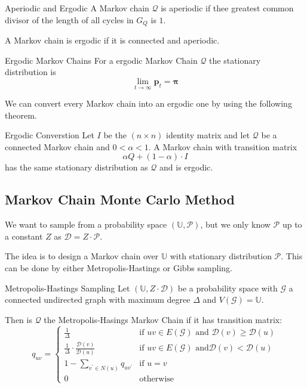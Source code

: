 \documentclass[english]{panikzettel}
\begin{document}

\begin{defi}{Aperiodic and Ergodic}
A Markov chain $\mathcal{Q}$ is aperiodic if thee greatest common divisor of the length of all cycles in $G_Q$ is $1$.

A Markov chain is ergodic if it is connected and aperiodic.
\end{defi}

\begin{theo}{Ergodic Markov Chains}
For a ergodic Markov Chain $\mathcal{Q}$ the stationary distribution is
$$
\lim_{t \rightarrow \infty} \textbf{p}_t = \boldsymbol{\pi}
$$
\end{theo}

We can convert every Markov chain into an ergodic one by using the following theorem.

\begin{theo}{Ergodic Converstion}
Let $I$ be the $(n\times n)$ identity matrix and let $\mathcal{Q}$ be a connected Markov chain and $0 < \alpha < 1$. A Markov chain with transition matrix
\[
\alpha Q + (1 - \alpha)\cdot I
\]
has the same stationary distribution as $\mathcal{Q}$ and is ergodic.
\end{theo}

\subsection{Markov Chain Monte Carlo Method}
We want to sample from a probability space $(\mathbb{U}, \mathcal{P})$, but we only know $\mathcal{P}$ up to a constant $Z$ as $\mathcal{D} = Z \cdot \mathcal{P}$.

The idea is to design a Markov chain over $\mathbb{U}$ with stationary distribution $\mathcal{P}$. This can be done by either Metropolis-Hastings or Gibbs sampling.

\begin{defi}{Metropolis-Hastings Sampling}
Let $(\mathbb{U}, Z \cdot \mathcal{D})$ be a probability space with $\mathcal{G}$ a connected undirected graph with maximum degree $\Delta$ and $V(\mathcal{G}) = \mathbb{U}$.

Then is $\mathcal{Q}$ the Metropolis-Hasings Markov Chain if it has transition matrix:
$$
q_{uv} =
\begin{cases}
\frac{1}{\Delta} & \text{if } uv \in E(\mathcal{G}) \text{ and } \mathcal{D}(v) \geq \mathcal{D}(u) \\
\frac{1}{\Delta} \cdot \frac{\mathcal{D}(v)}{\mathcal{D}(u)} & \text{if } uv \in E(\mathcal{G}) \text{  and} \mathcal{D}(v) < \mathcal{D}(u) \\
1 - \sum_{v^\prime \in N(u)} q_{uv^\prime} & \text{if } u = v \\
0 & \text{otherwise}
\end{cases}
$$
\end{defi}
\end{document}
